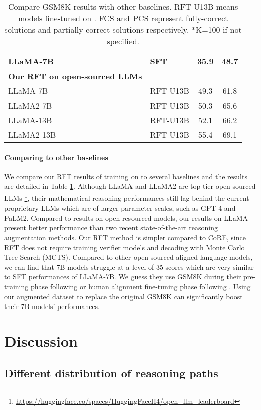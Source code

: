 \documentclass{article} \usepackage{iclr2021_conference,times}
\begin{document}
\begin{table}[t]
\begin{tabular}{ll|cc}
  LLaMA-7B & SFT & 35.9 & 48.7 \\
  \hline
  \bf{Our RFT on open-sourced LLMs} &&& \\
  LLaMA-7B & RFT-U13B & 49.3 & 61.8 \\
  LLaMA2-7B & RFT-U13B & 50.3 & 65.6 \\
  LLaMA-13B & RFT-U13B &  52.1 & 66.2 \\
  LLaMA2-13B & RFT-U13B &  55.4 & 69.1 \\
\hline
    \end{tabular}
    \caption{Compare GSM8K results with other baselines. RFT-U13B means models fine-tuned on . FCS and PCS represent fully-correct solutions and partially-correct solutions respectively. *K=100 if not specified.}
    \label{tab:compare}
\end{table}

\paragraph{Comparing to other baselines}

We compare our RFT results of training on  to several baselines and the results are detailed in Table \ref{tab:compare}. Although LLaMA and LLaMA2 are top-tier open-sourced LLMs \footnote{\url{https://huggingface.co/spaces/HuggingFaceH4/open_llm_leaderboard}}, their mathematical reasoning performances still lag behind the current proprietary LLMs which are of larger parameter scales, such as GPT-4 and PaLM2. Compared to results on open-resourced models, our results on LLaMA present better performance than two recent state-of-the-art reasoning augmentation methods. Our RFT method is simpler compared to CoRE, since RFT does not require training verifier models and decoding with Monte Carlo Tree Search (MCTS).
Compared to other open-sourced aligned language models, we can find that 7B models struggle at a level of 35 scores which are very similar to SFT performances of LLaMA-7B. We guess they use GSM8K during their pre-training phase following \citep{gpt4} or human alignment fine-tuning phase following \citep{alpaca-cot}.
Using our augmented dataset  to replace the original GSM8K can significantly boost their 7B models' performances.

\section{Discussion}

\subsection{Different distribution of reasoning paths}
\end{document}
